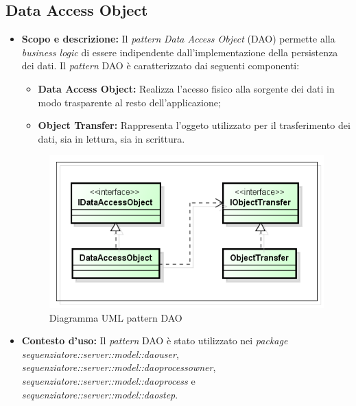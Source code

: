 \subsection{Data Access Object}
\begin{itemize}
\item \textbf{Scopo e descrizione:}
Il \textit{pattern} \textit{Data Access Object} (DAO) permette alla \textit{business logic} di essere indipendente dall'implementazione della persistenza dei dati.
Il \textit{pattern} DAO è caratterizzato dai seguenti componenti:
\begin{itemize}
\item \textbf{Data Access Object:}
Realizza l'acesso fisico alla sorgente dei dati in modo trasparente al resto dell'applicazione;
\item \textbf{Object Transfer:}
Rappresenta l'oggeto utilizzato per il trasferimento dei dati, sia in lettura, sia in scrittura.
\end{itemize}
\begin{figure}[H] \centering \includegraphics[scale=1]{./pattern/dao.png} \caption{Diagramma UML pattern DAO}
\end{figure}
\item \textbf{Contesto d'uso:}
Il \textit{pattern} DAO è stato utilizzato nei \textit{package sequenziatore::server::model::daouser}, \textit{sequenziatore::server::model::daoprocessowner}, \textit{sequenziatore::server::model::daoprocess} e \textit{sequenziatore::server::model::daostep}. 
\end{itemize}